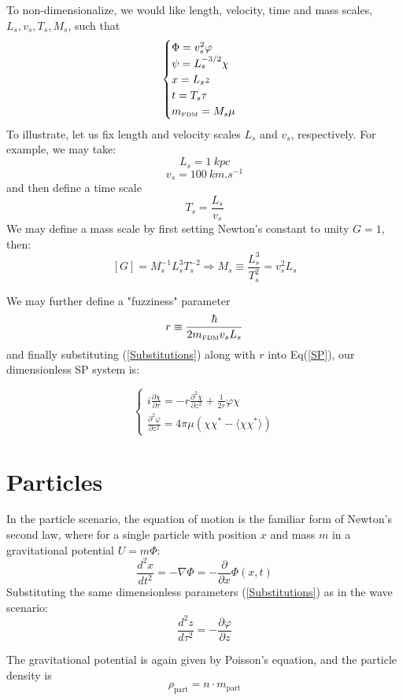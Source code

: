 \documentclass{book}
\newcommand{\pd}{\partial}
\begin{document}
To non-dimensionalize, we would like length, velocity, time and mass scales, $L_s, v_s,T_s,M_s$, such that
\begin{equation}
    \begin{cases}
    \Phi = v_s^2 \varphi\\
    \psi = L_s^{-3/2} \chi\\
    x = L_s z\\
    t = T_s \tau\\
    m_\text{\tiny{FDM}} = M_s \mu
    \end{cases}
    \label{Substitutions}
\end{equation}
To illustrate, let us fix length and velocity scales $L_s$ and $v_s$, respectively. For example, we may take:
$$L_s = \SI{1}{kpc} $$
$$v_s = \SI{100}{km.s^{-1}}$$
and then define a time scale 
$$T_s  = \frac{L_s}{v_s}$$
We may define a mass scale by first setting Newton's constant to unity $G = 1$, then:
$$[G] = M_s^{-1} L_s^3 T_s^{-2} \Rightarrow M_s \equiv \frac{L_s^3}{T_s^2} = v_s^2 L_s$$

We may further define a "fuzziness" parameter 
$$r \equiv \frac{\hbar}{2 m_\text{\tiny{FDM}} v_s L_s}$$
and finally substituting (\ref{Substitutions}) along with $r$ into Eq(\ref{SP}), our dimensionless SP system is:

\begin{equation}
    \begin{cases}
    i\frac{\pd \chi}{\pd \tau} = -r\frac{\pd^2 \chi}{\pd z^2} + \frac{1}{2r}\varphi\chi \\
    
    \frac{\pd^2 \varphi}{\pd z^2} = 4\pi\mu (\chi\chi^* - \langle\chi\chi^*\rangle)
    \end{cases}
    \label{SP-NonDim}
\end{equation}

\section{Particles}
In the particle scenario, the equation of motion is the familiar form of Newton's second law, where for a single particle with position $x$ and mass $m$ in a gravitational potential $U = m\Phi$:
$$\frac{d^2 x}{d t^2} = -\nabla\Phi = -\frac{\pd}{\pd x}\Phi(x,t)$$
Substituting the same dimensionless parameters (\ref{Substitutions}) as in the wave scenario:
$$\frac{d^2 z}{d\tau^2} = -\frac{\pd \varphi}{\pd z}$$

The gravitational potential is again given by Poisson's equation, and the particle density is 
\begin{equation}
\rho_\text{part} = n \cdot m_{\text{part}}
\label{Particle density}
\end{equation}
\end{document}
